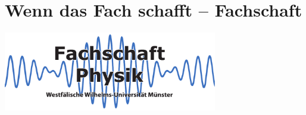 
\section{Wenn das Fach schafft -- Fachschaft}
\begin{center}
\vspace{-0.5cm}
\includegraphics[width=0.7\textwidth]{res/fsphys_logo.pdf}
\vspace{-0.5cm}
\end{center}
